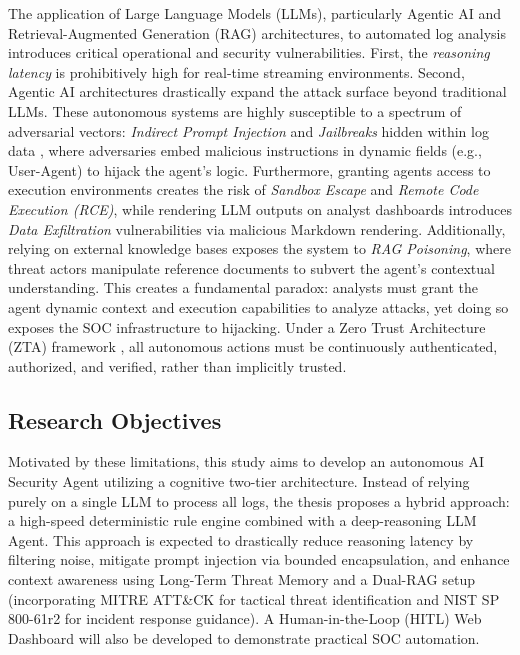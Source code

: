 \documentclass[12pt,a4paper]{article}
\begin{document}
The application of Large Language Models (LLMs), particularly Agentic AI and Retrieval-Augmented Generation (RAG) architectures, to automated log analysis introduces critical operational and security vulnerabilities. First, the \textit{reasoning latency} is prohibitively high for real-time streaming environments. Second, Agentic AI architectures drastically expand the attack surface beyond traditional LLMs. These autonomous systems are highly susceptible to a spectrum of adversarial vectors: \textit{Indirect Prompt Injection} and \textit{Jailbreaks} hidden within log data \cite{greshake2023}, where adversaries embed malicious instructions in dynamic fields (e.g., User-Agent) to hijack the agent's logic. Furthermore, granting agents access to execution environments creates the risk of \textit{Sandbox Escape} and \textit{Remote Code Execution (RCE)}, while rendering LLM outputs on analyst dashboards introduces \textit{Data Exfiltration} vulnerabilities via malicious Markdown rendering. Additionally, relying on external knowledge bases exposes the system to \textit{RAG Poisoning}, where threat actors manipulate reference documents to subvert the agent's contextual understanding. This creates a fundamental paradox: analysts must grant the agent dynamic context and execution capabilities to analyze attacks, yet doing so exposes the SOC infrastructure to hijacking. Under a Zero Trust Architecture (ZTA) framework \cite{nist80207}, all autonomous actions must be continuously authenticated, authorized, and verified, rather than implicitly trusted.

\subsection{Research Objectives}
Motivated by these limitations, this study aims to develop an autonomous AI Security Agent utilizing a cognitive two-tier architecture. Instead of relying purely on a single LLM to process all logs, the thesis proposes a hybrid approach: a high-speed deterministic rule engine combined with a deep-reasoning LLM Agent. This approach is expected to drastically reduce reasoning latency by filtering noise, mitigate prompt injection via bounded encapsulation, and enhance context awareness using Long-Term Threat Memory and a Dual-RAG setup (incorporating MITRE ATT\&CK for tactical threat identification and NIST SP 800-61r2 for incident response guidance). A Human-in-the-Loop (HITL) Web Dashboard will also be developed to demonstrate practical SOC automation.
\end{document}
